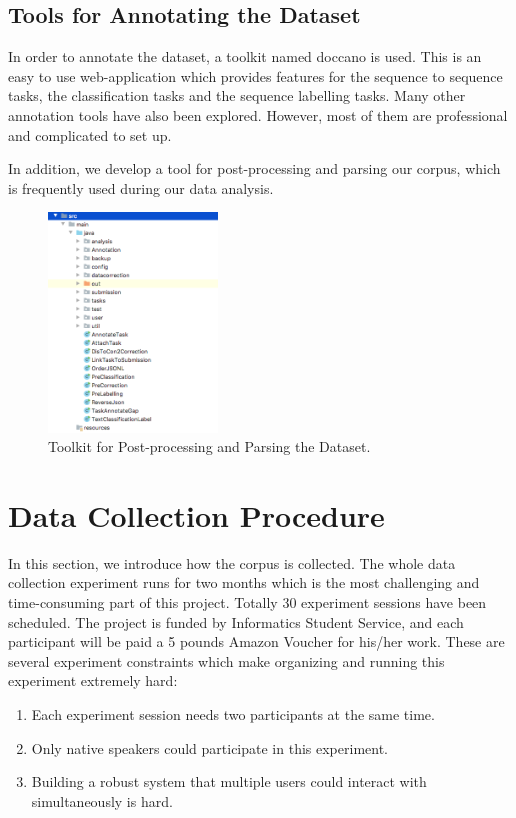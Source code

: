 \documentclass[bsc,frontabs,twoside,singlespacing,parskip,deptreport]{infthesis}     %
\begin{document}
\subsection{Tools for Annotating the Dataset}

In order to annotate the dataset, a toolkit named doccano \cite{doccano} is used. This is an easy to use web-application which provides features for the sequence to sequence tasks, the classification tasks and the sequence labelling tasks. Many other annotation tools have also been explored. However, most of them are professional and complicated to set up.

In addition, we develop a tool for post-processing and parsing our corpus, which is frequently used during our data analysis.

\begin{figure}[h]
    \centering
    \includegraphics[width=0.4\textwidth]{parser.png}
    \caption{Toolkit for Post-processing and Parsing the Dataset.}
    \label{fig:parser}
\end{figure}

\newpage
\section{Data Collection Procedure}

In this section, we introduce how the corpus is collected. The whole data collection experiment runs for two months which is the most challenging and time-consuming part of this project. Totally 30 experiment sessions have been scheduled. The project is funded by Informatics Student Service, and each participant will be paid a 5 pounds Amazon Voucher for his/her work. These are several experiment constraints which make organizing and running this experiment extremely hard:

\begin{enumerate}
   \item Each experiment session needs two participants at the same time. 

   \item Only native speakers could participate in this experiment.
 
   \item Building a robust system that multiple users could interact with simultaneously is hard. 
       
\end{enumerate}
\end{document}
